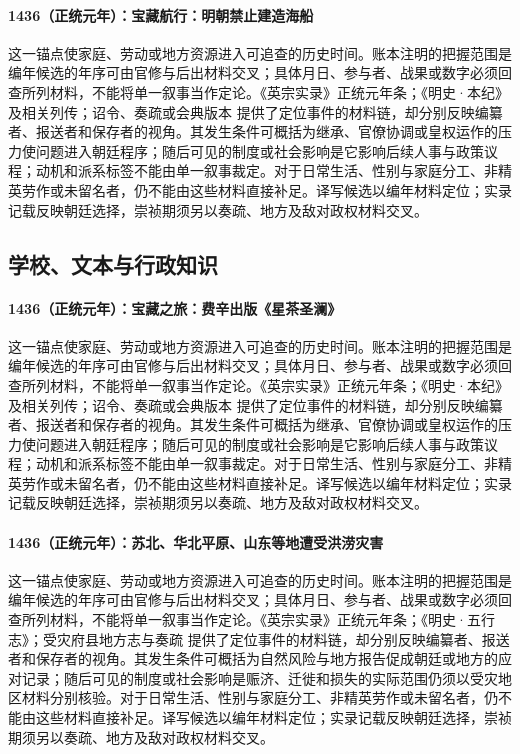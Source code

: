 \paragraph{1436（正统元年）：宝藏航行：明朝禁止建造海船} 这一锚点使家庭、劳动或地方资源进入可追查的历史时间。账本注明的把握范围是编年候选的年序可由官修与后出材料交叉；具体月日、参与者、战果或数字必须回查所列材料，不能将单一叙事当作定论。《英宗实录》正统元年条；《明史·本纪》及相关列传；诏令、奏疏或会典版本 提供了定位事件的材料链，却分别反映编纂者、报送者和保存者的视角。其发生条件可概括为继承、官僚协调或皇权运作的压力使问题进入朝廷程序；随后可见的制度或社会影响是它影响后续人事与政策议程；动机和派系标签不能由单一叙事裁定。对于日常生活、性别与家庭分工、非精英劳作或未留名者，仍不能由这些材料直接补足。译写候选以编年材料定位；实录记载反映朝廷选择，崇祯期须另以奏疏、地方及敌对政权材料交叉。

\subsection{学校、文本与行政知识}

\paragraph{1436（正统元年）：宝藏之旅：费辛出版《星茶圣澜》} 这一锚点使家庭、劳动或地方资源进入可追查的历史时间。账本注明的把握范围是编年候选的年序可由官修与后出材料交叉；具体月日、参与者、战果或数字必须回查所列材料，不能将单一叙事当作定论。《英宗实录》正统元年条；《明史·本纪》及相关列传；诏令、奏疏或会典版本 提供了定位事件的材料链，却分别反映编纂者、报送者和保存者的视角。其发生条件可概括为继承、官僚协调或皇权运作的压力使问题进入朝廷程序；随后可见的制度或社会影响是它影响后续人事与政策议程；动机和派系标签不能由单一叙事裁定。对于日常生活、性别与家庭分工、非精英劳作或未留名者，仍不能由这些材料直接补足。译写候选以编年材料定位；实录记载反映朝廷选择，崇祯期须另以奏疏、地方及敌对政权材料交叉。

\paragraph{1436（正统元年）：苏北、华北平原、山东等地遭受洪涝灾害} 这一锚点使家庭、劳动或地方资源进入可追查的历史时间。账本注明的把握范围是编年候选的年序可由官修与后出材料交叉；具体月日、参与者、战果或数字必须回查所列材料，不能将单一叙事当作定论。《英宗实录》正统元年条；《明史·五行志》；受灾府县地方志与奏疏 提供了定位事件的材料链，却分别反映编纂者、报送者和保存者的视角。其发生条件可概括为自然风险与地方报告促成朝廷或地方的应对记录；随后可见的制度或社会影响是赈济、迁徙和损失的实际范围仍须以受灾地区材料分别核验。对于日常生活、性别与家庭分工、非精英劳作或未留名者，仍不能由这些材料直接补足。译写候选以编年材料定位；实录记载反映朝廷选择，崇祯期须另以奏疏、地方及敌对政权材料交叉。

